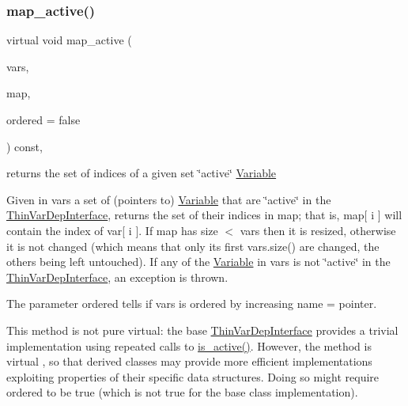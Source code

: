 \subsubsection{\texorpdfstring{map\+\_\+active()}{map\_active()}}
{\footnotesize\ttfamily virtual void map\+\_\+active (\begin{DoxyParamCaption}\item[{const std\+::vector$<$ \mbox{\hyperlink{class_s_m_spp__di__unipi__it_1_1_variable}{Variable}} $\ast$$>$ \&}]{vars,  }\item[{\mbox{\hyperlink{group___thin_var_dep_interface___c_l_a_s_s_e_s_ga9a1284953e2aa5222b5867c0a7f98499}{Vec\+\_\+\+Index}} \&}]{map,  }\item[{const bool}]{ordered = {\ttfamily false} }\end{DoxyParamCaption}) const\hspace{0.3cm}{\ttfamily [inline]}, {\ttfamily [virtual]}}



returns the set of indices of a given set \char`\"{}active\char`\"{} \mbox{\hyperlink{class_s_m_spp__di__unipi__it_1_1_variable}{Variable}} 

Given in vars a set of (pointers to) \mbox{\hyperlink{class_s_m_spp__di__unipi__it_1_1_variable}{Variable}} that are \char`\"{}active\char`\"{} in the \mbox{\hyperlink{class_s_m_spp__di__unipi__it_1_1_thin_var_dep_interface}{Thin\+Var\+Dep\+Interface}}, returns the set of their indices in map; that is, map\mbox{[} i \mbox{]} will contain the index of var\mbox{[} i \mbox{]}. If map has size $<$ vars then it is resized, otherwise it is not changed (which means that only its first vars.\+size() are changed, the others being left untouched). If any of the \mbox{\hyperlink{class_s_m_spp__di__unipi__it_1_1_variable}{Variable}} in vars is not \char`\"{}active\char`\"{} in the \mbox{\hyperlink{class_s_m_spp__di__unipi__it_1_1_thin_var_dep_interface}{Thin\+Var\+Dep\+Interface}}, an exception is thrown.

The parameter ordered tells if vars is ordered by increasing name = pointer.

This method is not pure virtual\+: the base \mbox{\hyperlink{class_s_m_spp__di__unipi__it_1_1_thin_var_dep_interface}{Thin\+Var\+Dep\+Interface}} provides a trivial implementation using repeated calls to \mbox{\hyperlink{group___thin_var_dep_interface___c_l_a_s_s_e_s_ga05297a4e506f89ec692a01aca971ce2d}{is\+\_\+active()}}. However, the method is virtual , so that derived classes may provide more efficient implementations exploiting properties of their specific data structures. Doing so might require ordered to be true (which is not true for the base class implementation). \mbox{\label{group___thin_var_dep_interface___c_l_a_s_s_e_s_ga79fc9d17094dc591d6b48bc296028d51}} 
